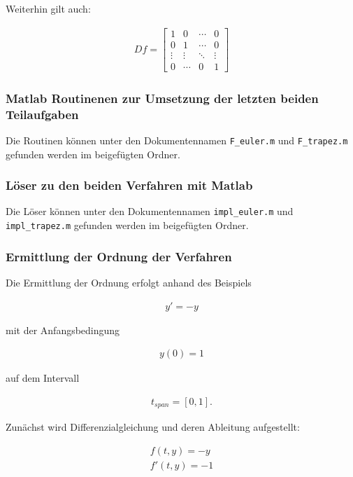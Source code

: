 \documentclass[
	pagesize,
	fontsize=12pt,
	paper=a4,
	oneside,
   reqno
]{scrartcl}
\begin{document}
Weiterhin gilt auch:

\begin{align*}
   Df =
   \begin{bmatrix*}
      1 & 0 & \cdots & 0 \\
      0 & 1 & \cdots & 0 \\
      \vdots & \vdots & \ddots & \vdots \\
      0 & \cdots & 0 & 1
   \end{bmatrix*}
\end{align*}

\subsubsection{Matlab Routinenen zur Umsetzung der letzten beiden Teilaufgaben}

Die Routinen können unter den Dokumentennamen \texttt{F\_euler.m} und \texttt{F\_trapez.m} gefunden werden im beigefügten Ordner.

\subsubsection{Löser zu den beiden Verfahren mit Matlab}

Die Löser können unter den Dokumentennamen \texttt{impl\_euler.m} und \texttt{impl\_trapez.m} gefunden werden im beigefügten Ordner.

\subsubsection{Ermittlung der Ordnung der Verfahren}

Die Ermittlung der Ordnung erfolgt anhand des Beispiels

\begin{align*}
   y' = -y
\end{align*}

mit der Anfangsbedingung

\begin{align*}
   y(0) = 1
\end{align*}

auf dem Intervall

\begin{align*}
   t_{span} = [0,1].
\end{align*}

Zunächst wird Differenzialgleichung und deren Ableitung aufgestellt:

\begin{align*}
   f(t,y) = -y \\
   f'(t,y) = -1
\end{align*}
\end{document}

